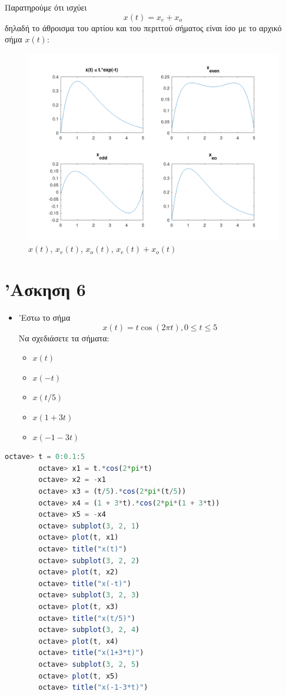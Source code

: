 \documentclass{article}
\begin{document}
Παρατηρούμε ότι ισχύει
\[x(t) = x_e + x_o\]
δηλαδή το άθροισμα του αρτίου και του περιττού σήματος είναι ίσο
με το αρχικό σήμα $x(t)$:
\begin{figure}[H]
        \centering
        \includegraphics[width=\linewidth]{res/fig5.png}
        \caption{$x(t)$, $x_e(t)$, $x_o(t)$, $x_e(t) + x_o(t)$}
\end{figure}

\section{'Ασκηση 6}

\begin{itemize}
        \item 'Εστω το σήμα
                \[x(t) = t\cos(2\pi t), 0 \leq t \leq 5\]
                Να σχεδιάσετε τα σήματα:
        \begin{itemize}
                \item $x(t)$
                \item $x(-t)$
                \item $x(t/5)$
                \item $x(1 + 3t)$
                \item $x(-1 - 3t)$
        \end{itemize}
\end{itemize}

\begin{lstlisting}[language=octave]
        octave> t = 0:0.1:5
        octave> x1 = t.*cos(2*pi*t)
        octave> x2 = -x1
        octave> x3 = (t/5).*cos(2*pi*(t/5))
        octave> x4 = (1 + 3*t).*cos(2*pi*(1 + 3*t))
        octave> x5 = -x4
        octave> subplot(3, 2, 1)
        octave> plot(t, x1)
        octave> title("x(t)")
        octave> subplot(3, 2, 2)
        octave> plot(t, x2)
        octave> title("x(-t)")
        octave> subplot(3, 2, 3)
        octave> plot(t, x3)
        octave> title("x(t/5)")
        octave> subplot(3, 2, 4)
        octave> plot(t, x4)
        octave> title("x(1+3*t)")
        octave> subplot(3, 2, 5)
        octave> plot(t, x5)
        octave> title("x(-1-3*t)")
\end{lstlisting}
\end{document}
